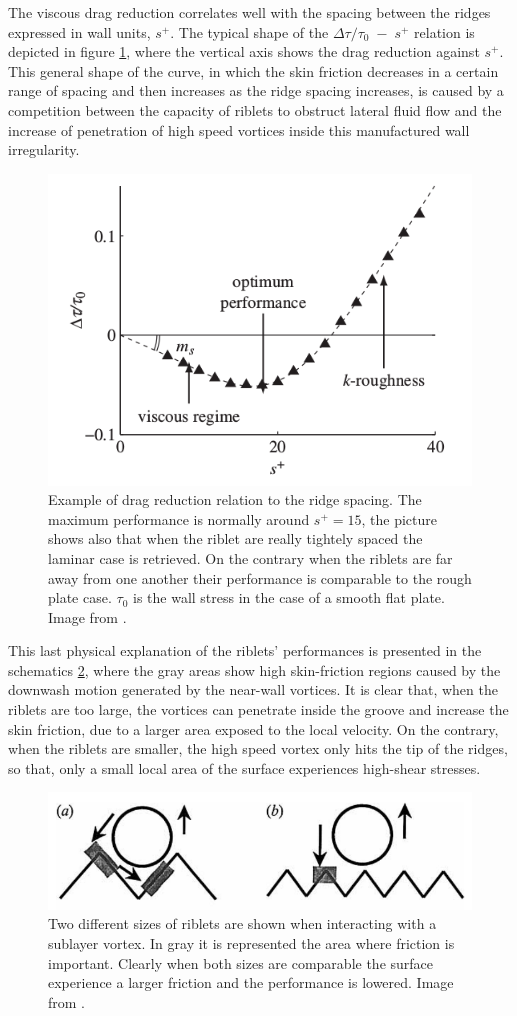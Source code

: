 The viscous drag reduction correlates well with the spacing between the ridges expressed in wall units, $ s^+ $. The typical shape of the $\Delta \tau/\tau_0 \; - \; s^+$ relation is depicted in figure \ref{fig:riblets_perf}, where the vertical axis shows the drag reduction against $s^+$.
This general shape of the curve, in which the skin friction decreases in a certain range of spacing and then increases as the ridge spacing  increases, is caused by a competition between the capacity of riblets to obstruct lateral fluid flow and the increase of penetration of high speed vortices inside this manufactured wall irregularity.

\begin{figure}[h]
	\centering
	\includegraphics[width=0.5\linewidth]{chapter_1/riblets_performance}
	\caption{Example of drag reduction relation to the ridge spacing. The maximum performance is normally around $ s^+ = 15 $, the picture shows also that when the riblet are really tightely spaced the laminar case is retrieved. On the contrary when the riblets are far away from one another their performance is comparable to the  rough plate case. $\tau_{0}$ is the wall stress in the case of a smooth flat plate. Image from \citet{jimenez2001turbulent}. }
	\label{fig:riblets_perf}
\end{figure}

This last physical explanation of the riblets' performances is presented in the schematics \ref{fig:riblets_schem}, where the gray areas show high skin-friction regions caused by the downwash motion generated by the near-wall vortices.
It is clear that, when the riblets are too large, the vortices can penetrate inside the groove and increase the skin friction, due to a larger area exposed to the local velocity.
On the contrary, when the riblets are smaller, the high speed vortex only hits the tip of the ridges, so that, only a small local area of the surface experiences high-shear stresses.

\begin{figure}[h]
	\centering
	\includegraphics[width=0.7\linewidth]{chapter_1/riblets1}
	\caption{Two different sizes of riblets are shown when interacting with a sublayer vortex. In gray it is represented the area where friction is important. Clearly when both sizes are comparable the surface experience a larger friction and the performance is lowered. Image from \citet{choi1993direct}.}
	\label{fig:riblets_schem}
\end{figure}

